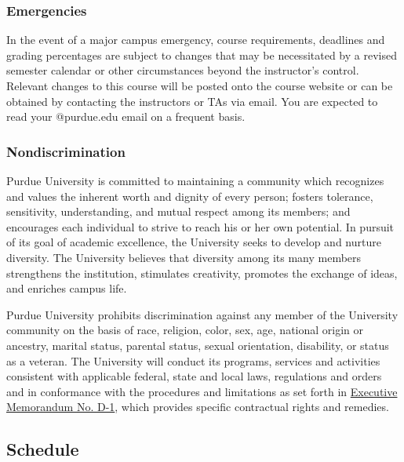 \documentclass{article}
\begin{document}
\hypertarget{emergencies_26}{}\subsubsection*{{Emergencies}}\label{emergencies_26}

In the event of a major campus emergency, course requirements, deadlines and grading percentages are subject to changes that may be necessitated by a revised semester calendar or other circumstances beyond the instructor’s control. Relevant changes to this course will be posted onto the course website or can be obtained by contacting the instructors or TAs via email. You are expected to read your @purdue.edu email on a frequent basis.

\hypertarget{nondiscrimination_27}{}\subsubsection*{{Nondiscrimination}}\label{nondiscrimination_27}

Purdue University is committed to maintaining a community which recognizes and values the inherent worth and dignity of every person; fosters tolerance, sensitivity, understanding, and mutual respect among its members; and encourages each individual to strive to reach his or her own potential. In pursuit of its goal of academic excellence, the University seeks to develop and nurture diversity. The University believes that diversity among its many members strengthens the institution, stimulates creativity, promotes the exchange of ideas, and enriches campus life.

Purdue University prohibits discrimination against any member of the University community on the basis of race, religion, color, sex, age, national origin or ancestry, marital status, parental status, sexual orientation, disability, or status as a veteran. The University will conduct its programs, services and activities consistent with applicable federal, state and local laws, regulations and orders and in conformance with the procedures and limitations as set forth in \href{http://www.purdue.edu/policies/pages/human_resources/d_1.html}{Executive Memorandum No. D-1}, which provides specific contractual rights and remedies.

\hypertarget{schedule_28}{}\subsection*{{Schedule}}\label{schedule_28}
\end{document}
